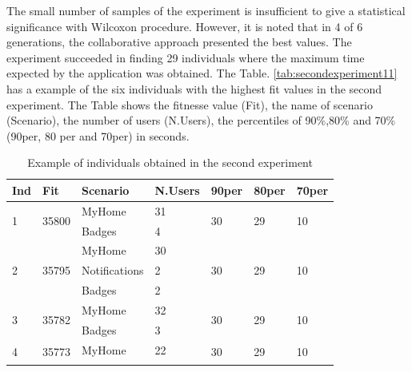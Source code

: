 The small number of samples of the experiment is insufficient to give a statistical significance with Wilcoxon procedure. However, it is noted that in 4 of 6 generations, the collaborative approach presented the best values. The experiment succeeded in finding 29 individuals where the maximum time expected by the application was obtained.  The Table. \ref{tab:secondexperiment11} has a example of the six individuals with the highest fit values in the second experiment. The Table shows the fitnesse value (Fit),  the name of scenario (Scenario), the number of users (N.Users), the percentiles of 90\%,80\% and 70\% (90per, 80 per and 70per) in seconds.  

\begin{table}[h]
\centering
\caption{Example of individuals obtained in the second experiment}
\label{tab:secondexperiment1}
\begin{tabular}{|l|l|l|l|l|l|l|}
\hline
Ind&Fit&Scenario&N.Users&90per&80per&70per\\ \hline
\multirow{2}{*}{1} & \multirow{2}{*}{35800} & MyHome        & 31              & \multirow{2}{*}{30} & \multirow{2}{*}{29} & \multirow{2}{*}{10} \\ \cline{3-4}
                   &                        & Badges        & 4               &                     &                     &                     \\ \hline
\multirow{3}{*}{2} & \multirow{3}{*}{35795} & MyHome        & 30              & \multirow{3}{*}{30} & \multirow{3}{*}{29} & \multirow{3}{*}{10} \\ \cline{3-4}
                   &                        & Notifications & 2               &                     &                     &                     \\ \cline{3-4}
                   &                        & Badges        & 2               &                     &                     &                     \\ \hline
\multirow{2}{*}{3} & \multirow{2}{*}{35782} & MyHome        & 32              & \multirow{2}{*}{30} & \multirow{2}{*}{29} & \multirow{2}{*}{10} \\ \cline{3-4}
                   &                        & Badges        & 3               &                     &                     &                     \\ \hline
\multirow{3}{*}{4} & \multirow{3}{*}{35773} & MyHome        & 22              & \multirow{3}{*}{30} & \multirow{3}{*}{29} & \multirow{3}{*}{10} \\ \cline{3-4}

\end{tabular}
\end{table}
